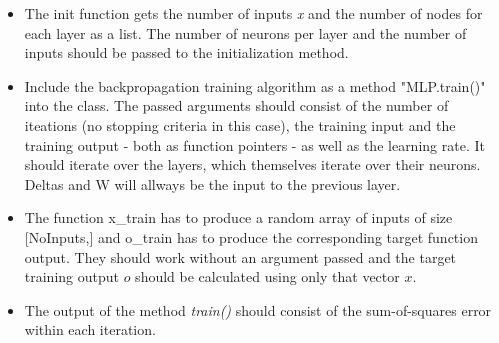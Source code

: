 \documentclass[11pt]{article}
\begin{document}
\begin{itemize}
\item
  The init function gets the number of inputs \emph{x} and the number of
  nodes for each layer as a list. The number of neurons per layer and
  the number of inputs should be passed to the initialization method.
\item
  Include the backpropagation training algorithm as a method
  "MLP.train()" into the class. The passed arguments should consist of
  the number of iteations (no stopping criteria in this case), the
  training input and the training output - both as function pointers -
  as well as the learning rate. It should iterate over the layers, which
  themselves iterate over their neurons. Deltas and W will allways be
  the input to the previous layer.
\item
  The function x\_train has to produce a random array of inputs of size
  {[}NoInputs,{]} and o\_train has to produce the corresponding target
  function output. They should work without an argument passed and the
  target training output \(o\) should be calculated using only that
  vector \(x\).
\item
  The output of the method \emph{train()} should consist of the
  sum-of-squares error within each iteration.
\end{itemize}
\end{document}
